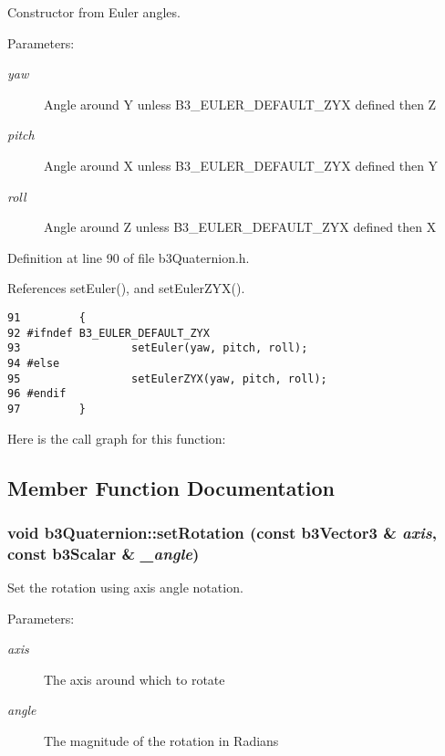 Constructor from Euler angles. 

\begin{Desc}
\item[Parameters:]
\begin{description}
\item[{\em yaw}]Angle around Y unless B3\_\-EULER\_\-DEFAULT\_\-ZYX defined then Z \item[{\em pitch}]Angle around X unless B3\_\-EULER\_\-DEFAULT\_\-ZYX defined then Y \item[{\em roll}]Angle around Z unless B3\_\-EULER\_\-DEFAULT\_\-ZYX defined then X \end{description}
\end{Desc}


Definition at line 90 of file b3Quaternion.h.

References setEuler(), and setEulerZYX().

\begin{Code}\begin{verbatim}91         { 
92 #ifndef B3_EULER_DEFAULT_ZYX
93                 setEuler(yaw, pitch, roll); 
94 #else
95                 setEulerZYX(yaw, pitch, roll); 
96 #endif 
97         }
\end{verbatim}
\end{Code}




Here is the call graph for this function:

\subsection{Member Function Documentation}
\hypertarget{classb3_quaternion_af98a2aed426d63aacf993c354bb4571}{
\subsubsection[setRotation]{\setlength{\rightskip}{0pt plus 5cm}void b3Quaternion::setRotation (const b3Vector3 \& {\em axis}, \/  const b3Scalar \& {\em \_\-angle})}}
\label{classb3_quaternion_af98a2aed426d63aacf993c354bb4571}


Set the rotation using axis angle notation. 

\begin{Desc}
\item[Parameters:]
\begin{description}
\item[{\em axis}]The axis around which to rotate \item[{\em angle}]The magnitude of the rotation in Radians \end{description}
\end{Desc}


